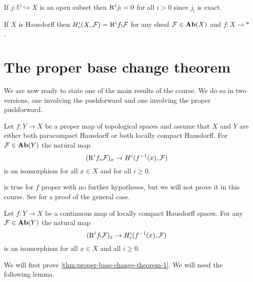 \begin{exmp}
	If $j\colon U \hookrightarrow X$ is an open subset then $\mathrm{R}^ij_! = 0$ for all $i > 0$ since $j_!$ is exact.
\end{exmp}

\begin{exc}
	If $X$ is Hausdorff then $\cohomology^i_c(X, \sh{F}) = \rightderived^i f_!\sh{F}$ for any sheaf $\mathcal{F} \in \operatorname{\mathbf{Ab}}(X)$ and $f\colon X \to *$. 
\end{exc}

\section{The proper base change theorem}
\noindent
We are now ready to state one of the main results of the course. We do so in two versions, one involving the pushforward and one involving the proper pushforward.

\begin{thm}\label{thm:proper-base-change-theorem-1}
	Let $f: Y \to X$ be a proper map of topological spaces and assume that $X$ and $Y$ are either both paracompact Hausdorff or both locally compact Hausdorff. For $\mathcal{F} \in \operatorname{\mathbf{Ab}}(Y)$ the natural map \[
    	(\rightderived^i f_* \sh{F})_x \to \cohomology^i(f^{-1}(x), \sh{F})
    \] is an isomorphism for all $x \in X$ and for all $i \geq 0$. 
\end{thm}

\begin{rmk}
	 is true for $f$ proper with no further hypotheses, but we will not prove it in this course. See \cite[Lemma~\textsc{09v6}]{stacks-project} for a proof of the general case.
\end{rmk}

\begin{thm}\label{thm:proper-base-changed-theorem-2}
	Let $f: Y \to X$ be a continuous map of locally compact Hausdorff spaces. For any $\mathcal{F} \in \operatorname{\mathbf{Ab}}(Y)$ the natural map \[
    	(\rightderived^i f_! \sh{F})_x \to \cohomology^i_c(f^{-1}(x), \sh{F})
    \] is an isomorphism for all $x \in X$ and all $i \geq 0$.
\end{thm}

We will first prove \cref{thm:proper-base-change-theorem-1}. We will need the following lemma.

